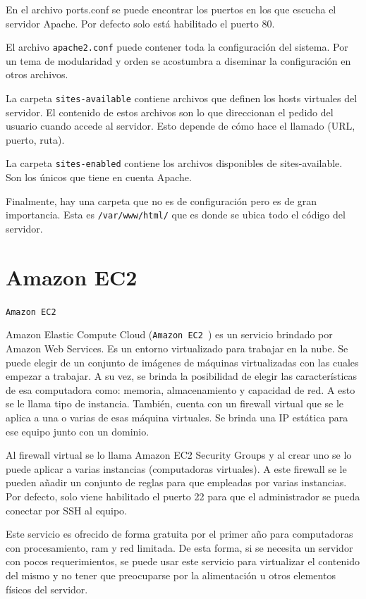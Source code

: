 En el archivo ports.conf se puede encontrar los puertos en los que escucha el servidor Apache. Por defecto solo está habilitado el puerto 80. 

El archivo \lstinline[columns=fixed]{apache2.conf} puede contener toda la configuración del sistema. Por un tema de modularidad y orden se acostumbra a diseminar la configuración en otros archivos.

La carpeta \lstinline[columns=fixed]{sites-available} contiene archivos que definen los hosts virtuales del servidor. El  contenido de estos archivos son lo que direccionan el pedido del usuario cuando accede al servidor. Esto depende de cómo hace el llamado (URL, puerto, ruta). 

La carpeta \lstinline[columns=fixed]{sites-enabled} contiene los archivos disponibles de sites-available. Son los únicos que tiene en cuenta Apache.

Finalmente, hay una carpeta que no es de configuración pero es de gran importancia. Esta es \lstinline[columns=fixed]{/var/www/html/} que es donde se ubica todo el código del servidor.

\section{Amazon EC2}

\lstinline[columns=fixed]{Amazon EC2}~\cite{AmazonEC2}

Amazon Elastic Compute Cloud (\lstinline[columns=fixed]{Amazon EC2}~\cite{AmazonEC2}) es un servicio brindado por Amazon Web Services. Es un entorno virtualizado para trabajar en la nube. Se puede elegir de un conjunto de imágenes de máquinas virtualizadas con las cuales empezar a trabajar. A su vez, se brinda la posibilidad de elegir las características de esa computadora como: memoria, almacenamiento y capacidad de red. A esto se le llama tipo de instancia. También, cuenta con un firewall virtual que se le aplica a una o varias de esas máquina virtuales. Se brinda una IP estática para ese equipo junto con un dominio. 

Al firewall virtual se lo llama Amazon EC2 Security Groups y al crear uno se lo puede aplicar a varias instancias (computadoras virtuales). A este firewall se le pueden añadir un conjunto de reglas para que empleadas por varias instancias. Por defecto, solo viene habilitado el puerto 22 para que el administrador se pueda conectar por SSH al equipo.

Este servicio es ofrecido de forma gratuita por el primer año para computadoras con procesamiento, ram y red limitada. De esta forma, si se necesita un servidor con pocos requerimientos, se puede usar este servicio para virtualizar el contenido del mismo y no tener que preocuparse por la alimentación u otros elementos físicos del servidor.

